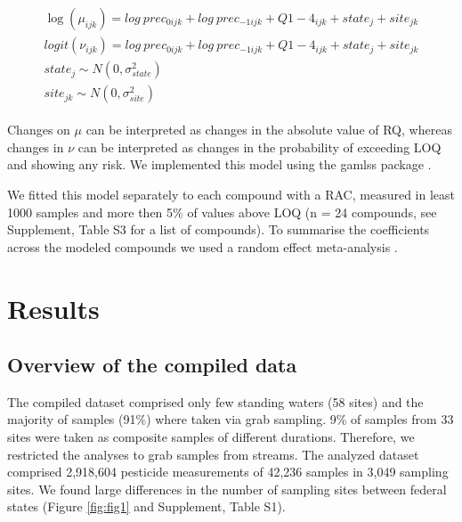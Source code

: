\documentclass[journal=esthag,manuscript=article]{achemso}
\begin{document}
\begin{align}
\begin{split}
\log(\mu_{ijk}) = log~prec_{0 ijk} + log~prec_{-1 ijk} + Q1-4_{ijk} + state_j + site_{jk}\\
logit(\nu_{ijk}) = log~prec_{0 ijk} + log~prec_{-1 ijk} + Q1-4_{ijk} + state_j + site_{jk}\\
state_{j} \sim N(0, \sigma^2_{state}) \\
site_{jk} \sim N(0, \sigma^2_{site})
\end{split}
\label{eqn:eqn4}
\end{align}

Changes on $\mu$ can be interpreted as changes in the absolute value of RQ, whereas changes in $\nu$ can be interpreted as changes in the probability of exceeding LOQ and showing any risk. 
We implemented this model using the gamlss package \cite{stasinopoulos_generalized_2007}.

We fitted this model separately to each compound with a RAC, measured in least 1000 samples and more then 5\% of values above LOQ (n = 24 compounds, see Supplement, Table S3 for a list of compounds). 
To summarise the coefficients across the modeled compounds we used a random effect meta-analysis \citep{harrison_getting_2011}.




\section{Results}
\subsection{Overview of the compiled data}

The compiled dataset comprised only few standing waters (58 sites) and the majority of samples (91\%) where taken via grab sampling.  %
9\% of samples from 33 sites were taken as composite samples of different durations.
Therefore, we restricted the analyses to grab samples from streams. 
The analyzed dataset comprised 2,918,604 pesticide measurements of 42,236 samples in 3,049 sampling sites.  %
We found large differences in the number of sampling sites between federal states (Figure \ref{fig:fig1} and Supplement, Table S1).
\end{document}
